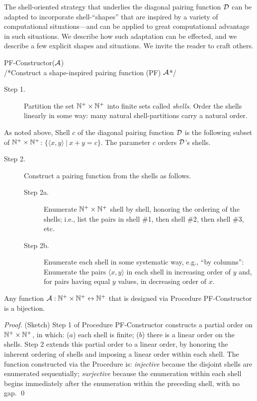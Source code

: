 The shell-oriented strategy that underlies the diagonal pairing
function $\mbox{$\cal D$}$ can be adapted to incorporate shell-``shapes'' that are
inspired by a variety of computational situations---and can be applied
to great computational advantage in such situations.  We describe how
such adaptation can be effected, and we describe a few explicit shapes
and situations.  We invite the reader to craft others.

\medskip

 {\small\sf PF-Constructor}($\mbox{$\cal A$}$) \\
/*Construct a shape-inspired pairing function (PF) $\mbox{$\cal A$}$*/
\begin{description}
\item[Step 1.]
%
Partition the set $\mathbb{N}^+ \times \mathbb{N}^+$ into finite sets called {\it
  shells}.  Order the shells linearly in some way: many natural
shell-partitions carry a natural order.
\end{description}
As noted above, Shell $c$ of the diagonal pairing function $\mbox{$\cal D$}$ is the
following subset of $\mathbb{N}^+ \times \mathbb{N}^+$: $\{ \langle x,y \rangle \ |
\ x+y = c \}$.  The parameter $c$ orders $\mbox{$\cal D$}$'s shells.

\begin{description}
\item[Step 2.]
Construct a pairing function from the shells as follows.
  \begin{description}
  \item[Step 2a.]
Enumerate $\mathbb{N}^+ \times \mathbb{N}^+$ shell by shell, honoring the ordering of
the shells; i.e., list the pairs in shell \#1, then shell \#2, then
shell \#3, etc.
  \item[Step 2b.]
Enumerate each shell in some systematic way, e.g., ``by columns'':
Enumerate the pairs $\langle x,y \rangle$ in each shell in increasing
order of $y$ and, for pairs having equal $y$ values, in decreasing
order of $x$.
  \end{description}
\end{description}

\begin{prop}
\label{thm:PF-construct}
Any function $\mbox{$\cal A$}: \mathbb{N}^+ \times \mathbb{N}^+ \leftrightarrow \mathbb{N}^+$ that is
designed via Procedure {\small\sf PF-Constructor} is a bijection.
\end{prop}

\begin{proof}(Sketch) Step 1 of Procedure {\small\sf PF-Constructor}
constructs a partial order on $\mathbb{N}^+ \times \mathbb{N}^+$, in which: ($a$) each
shell is finite; ($b$) there is a linear order on the shells.  Step 2
extends this partial order to a linear order, by honoring the inherent
ordering of shells and imposing a linear order within each shell.  The
function constructed via the Procedure is: {\em injective} because the
disjoint shells are enumerated sequentially; {\em surjective} because
the enumeration within each shell begins immediately after the
enumeration within the preceding shell, with no gap.  \qed
\end{proof}

